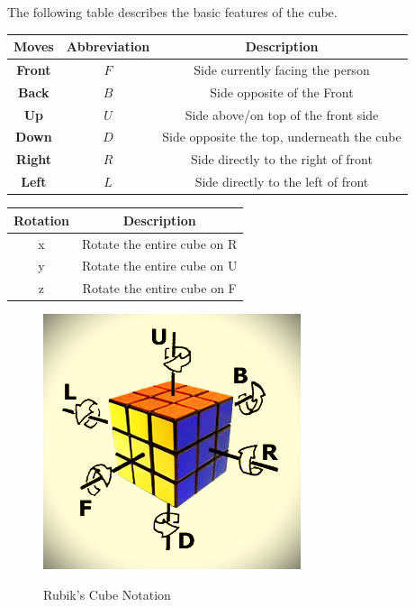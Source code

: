 \documentclass[12pt,a4paper]{article}
\theoremstyle{custom}
\begin{document}
The following table describes the basic features of the cube.

\begin{center}
\begin{tabular}{|c|c|c|}
\toprule
\textbf{Moves} & \textbf{Abbreviation} & \textbf{Description} \\
\midrule
\textbf{Front} & $F$ & Side currently facing the person \\
\textbf{Back} & $B$ & Side opposite of the Front \\
\textbf{Up} & $U$ & Side above/on top of the front side \\
\textbf{Down} & $D$ & Side opposite the top, underneath the cube \\
\textbf{Right} & $R$ & Side directly to the right of front \\
\textbf{Left} & $L$ & Side directly to the left of front \\
\bottomrule
\end{tabular}
\end{center}
\begin{center}
\begin{tabular}{|c|c|}
\hline
\textbf{Rotation} & \textbf{Description} \\
\hline
x & Rotate the entire cube on R \\
\hline
y & Rotate the entire cube on U \\
\hline
z & Rotate the entire cube on F\\
\hline
\end{tabular}
\end{center}
\begin{figure}[H]
\centering
\includegraphics[scale=0.95]{notation.png} \\
\caption{Rubik's Cube Notation}
\label{Intro moves Sing}
\end{figure}
\end{document}
